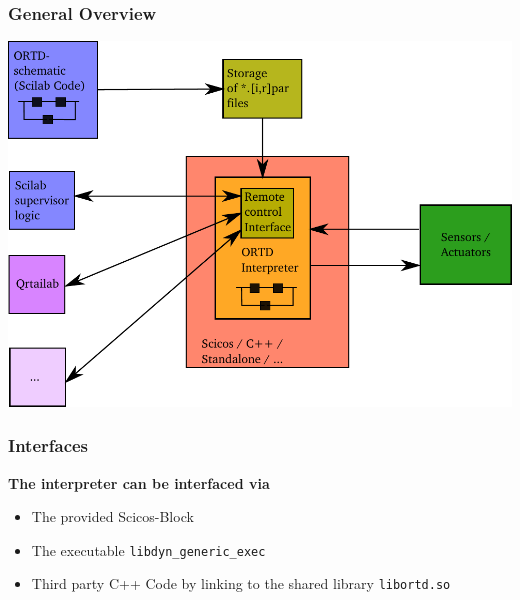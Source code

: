 \documentclass[serif,9pt,xcolor=dvipsnames]{beamer}
\begin{document}
\begin{frame}

 \frametitle{General Overview}



\includegraphics[trim=0mm 0mm 0mm 0mm, clip,width=0.95\linewidth]{../pictures/ortd_principle.pdf}

\end{frame}


\begin{frame}
\frametitle{Interfaces}

\textbf{The interpreter can be interfaced via}
  \begin{itemize}
   \item The provided Scicos-Block
   \item The executable \texttt{libdyn\_generic\_exec}
   \item Third party C++ Code by linking to the shared library { \texttt{libortd.so} }
  \end{itemize}

\end{frame}
\end{document}
